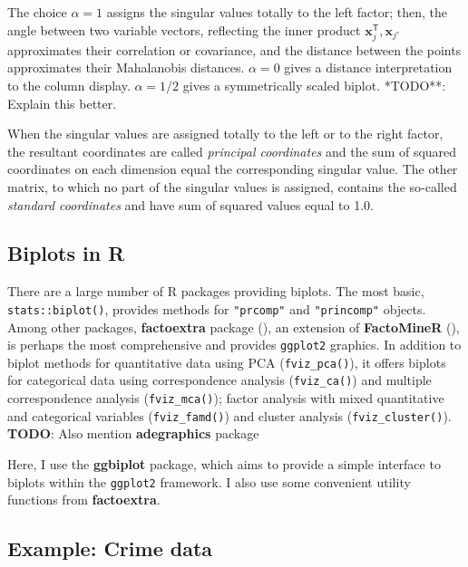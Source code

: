 \documentclass[
  letterpaper,
  10pt,
  krantz2]{krantz}
\begin{document}
The choice \(\alpha = 1\) assigns the singular values totally to the
left factor; then, the angle between two variable vectors, reflecting
the inner product \(\mathbf{x}_j^\mathsf{T}, \mathbf{x}_{j'}\)
approximates their correlation or covariance, and the distance between
the points approximates their Mahalanobis distances. \(\alpha = 0\)
gives a distance interpretation to the column display. \(\alpha = 1/2\)
gives a symmetrically scaled biplot. *TODO**: Explain this better.

When the singular values are assigned totally to the left or to the
right factor, the resultant coordinates are called \emph{principal
coordinates} and the sum of squared coordinates on each dimension equal
the corresponding singular value. The other matrix, to which no part of
the singular values is assigned, contains the so-called \emph{standard
coordinates} and have sum of squared values equal to 1.0.

\subsection{Biplots in R}\label{biplots-in-r}

There are a large number of R packages providing biplots. The most
basic, \texttt{stats::biplot()}, provides methods for \texttt{"prcomp"}
and \texttt{"princomp"} objects. Among other packages,
\textbf{factoextra} package (), an extension of \textbf{FactoMineR}
(), is perhaps the most
comprehensive and provides \texttt{ggplot2} graphics. In addition to
biplot methods for quantitative data using PCA (\texttt{fviz\_pca()}),
it offers biplots for categorical data using correspondence analysis
(\texttt{fviz\_ca()}) and multiple correspondence analysis
(\texttt{fviz\_mca()}); factor analysis with mixed quantitative and
categorical variables (\texttt{fviz\_famd()}) and cluster analysis
(\texttt{fviz\_cluster()}). \textbf{TODO}: Also mention
\textbf{adegraphics} package

Here, I use the \textbf{ggbiplot} package, which aims to provide a
simple interface to biplots within the \texttt{ggplot2} framework. I
also use some convenient utility functions from \textbf{factoextra}.

\subsection{Example: Crime data}\label{example-crime-data-1}
\end{document}
